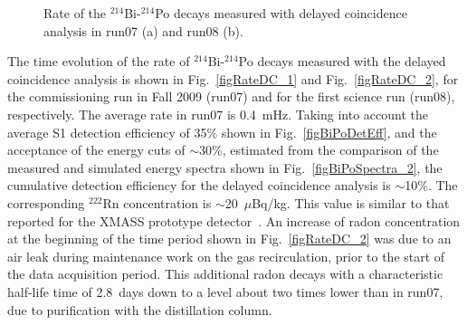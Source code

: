 \begin{figure}[!b]
\centering
{}
\caption[Rate of the $^{214}$Bi-$^{214}$Po decays measured with delayed coincidence analysis in run07 and run08]{Rate of the $^{214}$Bi-$^{214}$Po decays measured with delayed coincidence analysis in run07 (a) and run08 (b).}
\label{figRateDC}
\end{figure}

The time evolution of the rate of $^{214}$Bi-$^{214}$Po decays measured with the delayed coincidence analysis is shown in Fig.~\ref{figRateDC_1} and Fig.~\ref{figRateDC_2}, for the commissioning run in Fall 2009 (run07) and for the first science run (run08), respectively. 
The average rate in run07 is 0.4~mHz. Taking into account the average S1 detection efficiency of 35\% shown in Fig.~\ref{figBiPoDetEff}, and the acceptance of the energy cuts of $\sim$30\%, estimated from the comparison of the measured and simulated energy spectra shown in Fig.~\ref{figBiPoSpectra_2}, the cumulative detection efficiency for the delayed coincidence analysis is $\sim$10\%.
The corresponding $^{222}$Rn concentration is $\sim$20~$\mu$Bq/kg. This value is similar to that reported for the XMASS prototype detector~\cite{XmassRadon}. 
An increase of radon concentration at the beginning of the time period shown in Fig.~\ref{figRateDC_2} was due to an air leak during maintenance work on the gas recirculation, prior to the start of the data acquisition period. This additional radon decays with a characteristic half-life time of 2.8~days down to a level about two times lower than in run07, due to purification with the distillation column.

